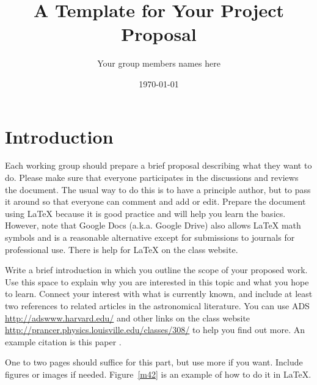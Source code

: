\documentclass[dvips,12pt]{article}
\begin{document}

\title{A Template for Your Project Proposal}
\author{Your group members names here}
\date{\today}



\maketitle


\section{Introduction}


Each working group should prepare a brief proposal describing what they want
to do.  Please make sure that everyone participates in the discussions and
reviews the document.  The usual way to do this is to have a principle author,
but to pass it around so that everyone can comment and add or edit.  Prepare the
document using \LaTeX\/ because it is good practice and will help you learn the
basics.  However, note that Google Docs (a.k.a. Google Drive) also allows
\LaTeX\/ math symbols and is a reasonable alternative except for submissions
to journals for professional use.  There is help for \LaTeX\/ on the
class website.

Write a brief introduction in which you  outline the scope of your proposed
work. Use this space to explain why you are interested in this topic and what
you hope to learn. Connect your interest with what is currently known, and
include at least two references to related articles in the astronomical
literature.  You can use ADS  \url{http://adswww.harvard.edu/} and other links
on the class website \url{http://prancer.physics.louisville.edu/classes/308/}
to help you find out more. An example citation is this paper
\cite{gonzalez2012}.

One to two pages should suffice for this part, but use more if you want.
Include figures or images if needed.  Figure~\ref{m42} is an example of  how to
do it in \LaTeX.
\end{document}
